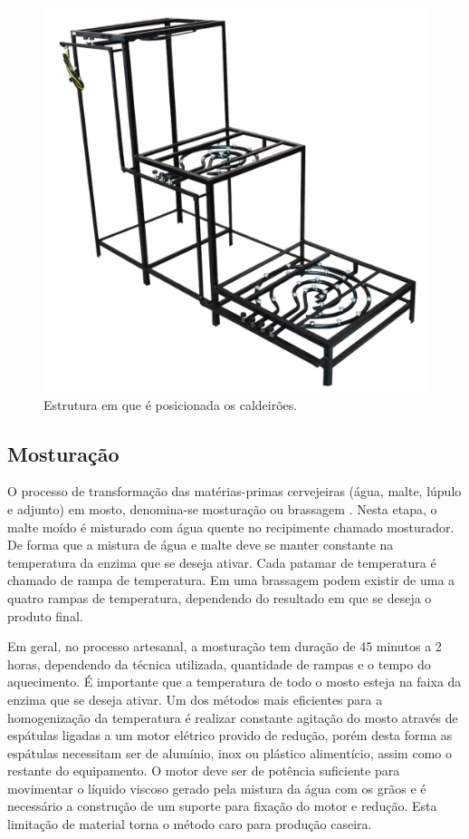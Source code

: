\begin{figure}[htb]
	\caption{\label{brewstand} Estrutura em que é posicionada os caldeirões.}
	\begin{center}
	    \includegraphics[width=0.75\linewidth]{./img/brewstand.jpg}
	\end{center}
\end{figure}



				\subsection{Mosturação}
O processo de transformação das matérias-primas cervejeiras (água, malte, lúpulo e adjunto) em mosto, denomina-se mosturação ou brassagem \cite{venturini2001}. Nesta etapa, o malte moído é misturado com água quente no recipimente chamado mosturador. De forma que a mistura de água e malte deve se manter constante na temperatura da enzima que se deseja ativar. Cada patamar de temperatura é chamado de rampa de temperatura. Em uma brassagem podem existir de uma a quatro rampas de temperatura, dependendo do resultado em que se deseja o produto final. 

Em geral, no processo artesanal, a mosturação tem duração de 45 minutos a 2 horas, dependendo da técnica utilizada, quantidade de rampas e o tempo do aquecimento. É importante que a temperatura de todo o mosto esteja na faixa da enzima que se deseja ativar. Um dos métodos mais eficientes para a homogenização da temperatura é realizar constante agitação do mosto através de espátulas ligadas a um motor elétrico provido de redução, porém desta forma as espátulas necessitam ser de alumínio, inox ou plástico alimentício, assim como o restante do equipamento. O motor deve ser de potência suficiente para movimentar o líquido viscoso gerado pela mistura da água com os grãos e é necessário a construção de um suporte para fixação do motor e redução. Esta limitação de material torna o método caro para produção caseira. 

